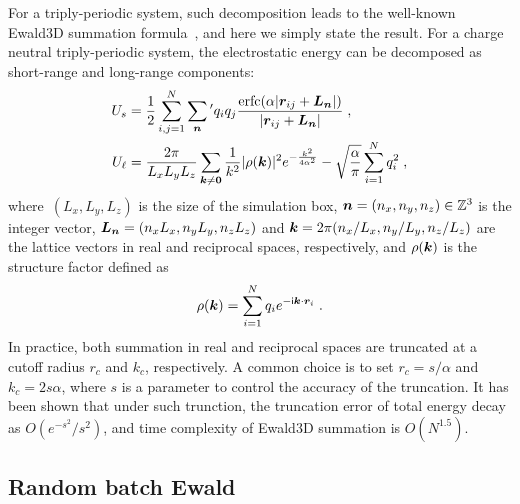 For a triply-periodic system, such decomposition leads to the well-known Ewald3D summation formula~\cite{Ewald1921AnnPhys}, and here we simply state the result.
For a charge neutral triply-periodic system, the electrostatic energy can be decomposed as short-range and long-range components:
\begin{align}
	U_{s} & = \frac{1}{2} \sum_{i, j=1}^N \sum_{\boldsymbol{n}}{}^\prime q_iq_j\frac{\mathrm{erfc}(\alpha\lvert\boldsymbol{r}_{ij}+\boldsymbol{L}_{\bm{n}} \rvert)}{\lvert\boldsymbol{r}_{ij}+ \boldsymbol{L}_{\bm{n}}\rvert} \;, \\
	U_{\ell} & = \frac{2 \pi}{L_x L_y L_z} \sum_{\boldsymbol{k} \neq \boldsymbol{0}} \frac{1}{k^2} \lvert\rho(\boldsymbol{k})\rvert^2 e^{-\frac{k^2}{4\alpha^2}} - \sqrt{\frac{\alpha}{\pi}}\sum_{i=1}^{N}q_i^2\;,
\end{align}
where~$(L_x, L_y, L_z)$ is the size of the simulation box, $\boldsymbol{n} = (n_x, n_y, n_z) \in \mathbb{Z}^3$ is the integer vector, $\boldsymbol{L}_{\boldsymbol{n}} = (n_x L_x, n_y L_y, n_z L_z)$ and $\boldsymbol{k} = 2\pi (n_x /L_x, n_y /L_y, n_z /L_z)$ are the lattice vectors in real and reciprocal spaces, respectively, and $\rho(\boldsymbol{k})$ is the structure factor defined as
\begin{equation}
	\rho(\boldsymbol{k}) = \sum_{i=1}^{N} q_i e^{-\mathsf i \boldsymbol{k}\cdot \boldsymbol{r}_i}\;.
\end{equation}
In practice, both summation in real and reciprocal spaces are truncated at a cutoff radius $r_c$ and $k_{c}$, respectively.
A common choice is to set $r_c = s / \alpha$ and $k_c = 2 s \alpha$, where $s$ is a parameter to control the accuracy of the truncation.
It has been shown that under such trunction, the truncation error of total energy decay as $O(e^{-s^2} / s^{2})$, and time complexity of Ewald3D summation is $O(N^{1.5})$.

\subsection{Random batch Ewald} \label{sec::rbe}

